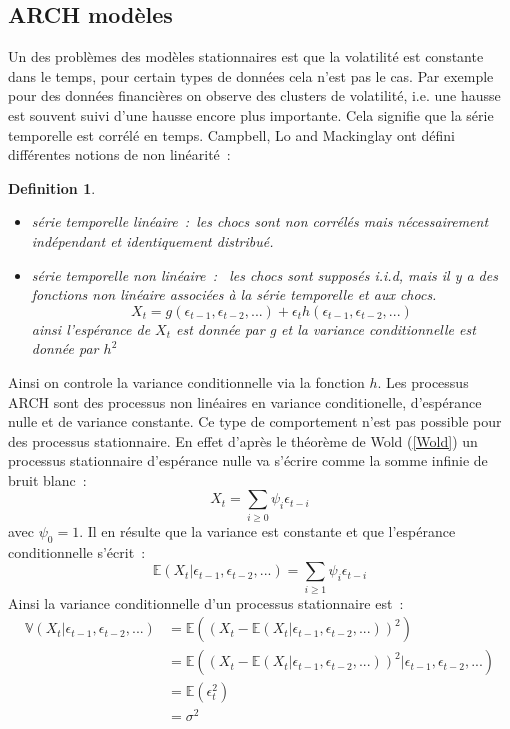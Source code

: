 \documentclass[11pt]{scrartcl} %
\newtheorem{Def}[theorem]{Definition}
\newcommand{\E}[1]{\mathbb{E}\left(#1\right)}
\begin{document}
\subsection{ARCH modèles}
Un des problèmes des modèles stationnaires est que la volatilité est constante dans le temps, pour certain types de données cela n'est pas le cas. Par exemple pour des données financières on observe des clusters de volatilité, i.e. une hausse est souvent suivi d'une hausse encore plus importante. Cela signifie que la série temporelle est corrélé en temps. Campbell, Lo and Mackinglay \cite{NonLinDef} ont défini différentes notions de non linéarité~:
\begin{Def}\label{nonlin}
\begin{itemize}
\item[i)] série temporelle linéaire~:~les chocs sont non corrélés mais nécessairement indépendant et identiquement distribué.\\
\item[ii)] série temporelle non linéaire~:~ les chocs sont supposés i.i.d, mais il y a des fonctions non linéaire associées à la série temporelle et aux chocs.
$$
X_t= g(\epsilon_{t-1},\epsilon_{t-2},...)+\epsilon_th(\epsilon_{t-1},\epsilon_{t-2},...)
$$
ainsi l'espérance de $X_t$ est donnée par g et la variance conditionnelle est donnée par $h^2$
\end{itemize}
\end{Def}
Ainsi on controle la variance conditionnelle via la fonction $h$. Les processus ARCH sont des processus non linéaires en variance conditionelle, d'espérance nulle et de variance constante. Ce type de comportement n'est pas possible pour des processus stationnaire. En effet d'après le théorème de Wold (\ref{Wold}) un processus stationnaire d'espérance nulle va s'écrire comme la somme infinie de bruit blanc~:
$$
X_t = \sum_{i\geq 0}\psi_i\epsilon_{t-i}
$$
avec $\psi_0=1$. Il en résulte que la variance est constante et que l'espérance conditionnelle s'écrit~: 
$$
\E{X_t|\epsilon_{t-1},\epsilon_{t-2},...}=\sum_{i\geq 1}\psi_i \epsilon_{t-i}
$$
Ainsi la variance conditionnelle d'un processus stationnaire est~:
\begin{align*}
\mathbb{V}\left(X_t|\epsilon_{t-1},\epsilon_{t-2},...\right)&= \E{\left(X_t-\E{X_t|\epsilon_{t-1},\epsilon_{t-2},...}\right)^2} \\
&= \E{\left(X_t-\E{X_t|\epsilon_{t-1},\epsilon_{t-2},...}\right)^2|\epsilon_{t-1},\epsilon_{t-2},...}\\
&= \E{\epsilon_t^2}\\
&= \sigma^2
\end{align*}
\end{document}

